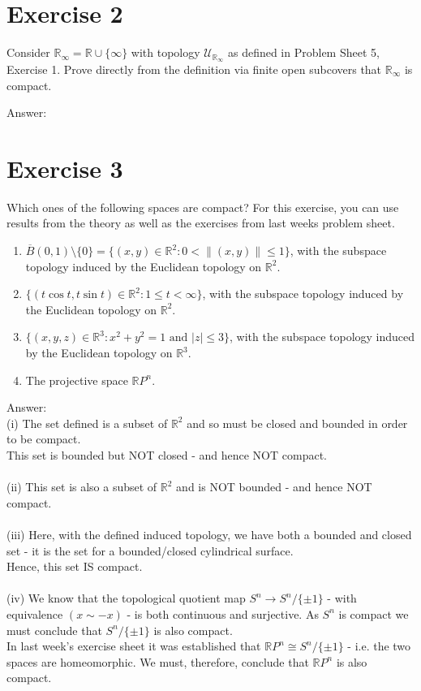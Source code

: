 \documentclass[12pt]{article}
\begin{document}
\newpage
\section*{Exercise 2}
\noindent
Consider $\mathbb{R}_{\infty}=\mathbb{R}\cup\{\infty\}$ with topology $\mathcal{U}_{\mathbb{R}_{\infty}}$ as defined in Problem Sheet 5, Exercise 1. Prove directly from the definition via finite open subcovers that $\mathbb{R}_{\infty}$ is compact.

\vspace{1cm}
\noindent
Answer:\\

\newpage
\section*{Exercise 3}
\noindent
Which ones of the following spaces are compact? For this exercise, you can use results from the theory as well as the exercises from last weeks problem sheet.
\begin{enumerate}[label=\roman*)]
\item $\overline{B}(0,1)\setminus\{0\}=\{(x,y)\in\mathbb{R}^2:0<\|(x,y)\|\leq 1\}$, with the subspace topology induced by the Euclidean topology on $\mathbb{R}^2$.
\item $\{(t\cos t,t\sin t)\in\mathbb{R}^2:1\leq t<\infty\}$, with the subspace topology induced by the Euclidean topology on $\mathbb{R}^2$.
\item $\{(x,y,z)\in\mathbb{R}^3:x^2+y^2=1\text{ and }|z|\leq 3\}$, with the subspace topology induced by the Euclidean topology on $\mathbb{R}^3$.
\item The projective space $\mathbb{R}P^n$.
\end{enumerate}

\vspace{1cm}
\noindent
Answer:\\
(i) The set defined is a subset of $\mathbb{R}^2$ and so must be closed and bounded in order to be compact.\\
This set is bounded but NOT closed - and hence NOT compact.\\
\\
(ii) This set is also a subset of $\mathbb{R}^2$ and is NOT bounded - and hence NOT compact.\\
\\
(iii) Here, with the defined induced topology, we have both a bounded and closed set - it is the set for a bounded/closed cylindrical surface.\\
Hence, this set IS compact.\\
\\
(iv) We know that the topological quotient map $S^n \to S^n/\{\pm 1\}$ - with equivalence $(x \sim -x)$ - is both continuous and surjective.  As $S^n$ is compact we must conclude that $S^n/\{\pm 1\}$ is also compact.\\
In last week's exercise sheet it was established that $\mathbb{R}P^n \cong S^n/\{\pm 1\}$ - i.e. the two spaces are homeomorphic.  We must, therefore, conclude that $\mathbb{R}P^n$ is also compact.
\end{document}
